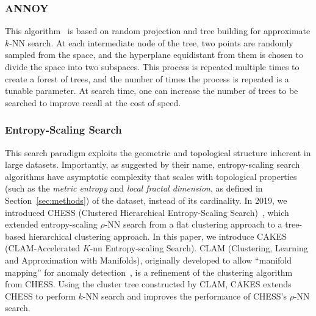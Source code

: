 \subsubsection{ANNOY}
\label{sec:introduction:related-works:annoy}

This algorithm~\cite{annoy} is based on random projection and tree building for approximate $k$-NN search.
At each intermediate node of the tree, two points are randomly sampled from the space, and the hyperplane equidistant from them is chosen to divide the space into two subspaces.
This process is repeated multiple times to create a forest of trees, and the number of times the process is repeated is a tunable parameter.
At search time, one can increase the number of trees to be searched to improve recall at the cost of speed.

\subsubsection{Entropy-Scaling Search}
\label{sec:introduction:related-works:entropy-scaling-search}

This search paradigm exploits the geometric and topological structure inherent in large datasets.
Importantly, as suggested by their name, entropy-scaling search algorithms have asymptotic complexity that scales with topological properties (such as the \emph{metric entropy} and \emph{local fractal dimension}, as defined in Section~\ref{sec:methods}) of the dataset, instead of its cardinality.
In 2019, we introduced CHESS (Clustered Hierarchical Entropy-Scaling Search)~\cite{ishaq2019clustered}, which extended entropy-scaling $\rho$-NN search from a flat clustering approach to a tree-based hierarchical clustering approach.
In this paper, we introduce CAKES (CLAM-Accelerated $K$-nn Entropy-scaling Search).
CLAM (Clustering, Learning and Approximation with Manifolds), originally developed to allow ``manifold mapping'' for anomaly detection~\cite{ishaq2021clustered}, is a refinement of the clustering algorithm from CHESS.
Using the cluster tree constructed by CLAM, CAKES extends CHESS to perform $k$-NN search and improves the performance of CHESS's $\rho$-NN search.
